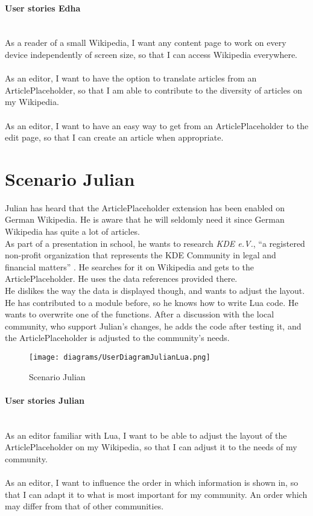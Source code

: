 \paragraph{User stories Edha} ~\\
As a reader of a small Wikipedia, I want any content page to work on every device independently of screen size, so that I can access Wikipedia everywhere. \\
\\
As an editor, I want to have the option to translate articles from an ArticlePlaceholder, so that I am able to contribute to the diversity of articles on my Wikipedia. \\
\\
As an editor, I want to have an easy way to get from an ArticlePlaceholder to the edit page, so that I can create an article when appropriate. 

\section{Scenario Julian}
Julian has heard that the ArticlePlaceholder extension has been enabled on German Wikipedia. He is aware that he will seldomly need it since German Wikipedia has quite a lot of articles. \\
As part of a presentation in school, he wants to research \textit{KDE e.V.}, ``a registered non-profit organization that represents the KDE Community in legal and financial matters'' \citep{kdeev}. He searches for it on Wikipedia and gets to the ArticlePlaceholder. He uses the data references provided there. \\
He dislikes the way the data is displayed though, and wants to adjust the layout. He has contributed to a module before, so he knows how to write Lua code. He wants to overwrite one of the functions. After a discussion with the local community, who support Julian's changes, he adds the code after testing it, and the ArticlePlaceholder is adjusted to the community's needs.

\begin{figure}[H]
	\centering
	\texttt{[image: diagrams/UserDiagramJulianLua.png]}
	\caption{Scenario Julian}
	\label{fig:ScenarioJulian}
\end{figure}

\paragraph{User stories Julian} ~\\
As an editor familiar with Lua, I want to be able to adjust the layout of the ArticlePlaceholder on my Wikipedia, so that I can adjust it to the needs of my community. \\
\\
As an editor, I want to influence the order in which information is shown in, so that I can adapt it to what is most important for my community. An order which may differ from that of other communities.

